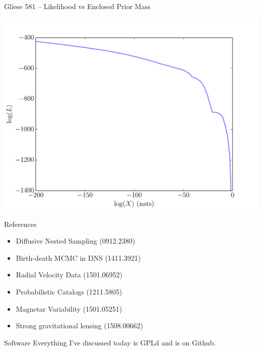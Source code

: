 \begin{frame}[t]{Gliese 581 -- Likelihood vs Enclosed Prior Mass}
\begin{center}
\includegraphics[scale=0.4]{ExoplanetFigures/logl.pdf}
\end{center}
\end{frame}


\begin{frame}[t]{References}
\begin{itemize}
\item Diffusive Nested Sampling (0912.2380)
\item Birth-death MCMC in DNS (1411.3921)
\item Radial Velocity Data (1501.06952)
\item Probabilistic Catalogs (1211.5805)
\item Magnetar Variability (1501.05251)
\item Strong gravitational lensing (1508.00662)
\end{itemize}
\end{frame}

\begin{frame}[t]{Software}
Everything I've discussed today is GPLd and is on Github.
\end{frame}

